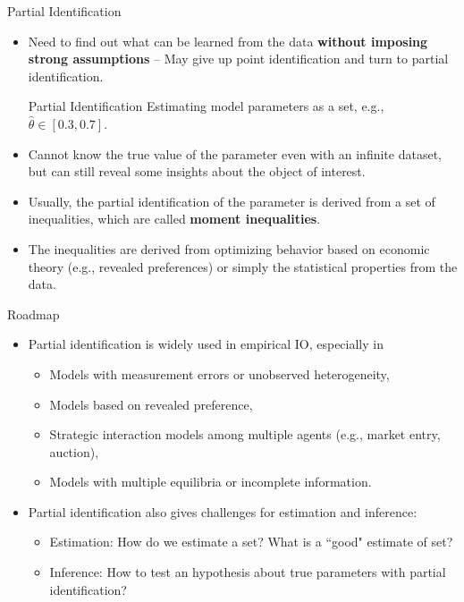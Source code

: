 \documentclass[aspectratio=169]{beamer}  %
\begin{document}
\begin{frame}{Partial Identification}

    \begin{itemize}
        \item Need to find out what can be learned from the data \textbf{without imposing strong assumptions} -- May give up point identification and turn to partial identification.
        \pause
        \begin{block}{Partial Identification}
            Estimating model parameters as a set, e.g., $\hat{\theta} \in [0.3, 0.7]$.
        \end{block}
        \pause
        \item Cannot know the true value of the parameter even with an infinite dataset, but can still reveal some insights about the object of interest.
        \item Usually, the partial identification of the parameter is derived from a set of inequalities, which are called \textbf{moment inequalities}.
        \item The inequalities are derived from optimizing behavior based on economic theory (e.g., revealed preferences) or simply the statistical properties from the data.

    \end{itemize}
\end{frame}

\begin{frame}{Roadmap}
    \begin{itemize}
        \item Partial identification is widely used in empirical IO, especially in
        \begin{itemize}
            \item Models with measurement errors or unobserved heterogeneity,
            \item Models based on revealed preference,
            \item Strategic interaction models among multiple agents (e.g., market entry, auction),
            \item Models with multiple equilibria or incomplete information.
        \end{itemize}
    \vspace{0.5cm}
        \item Partial identification also gives challenges for estimation and inference:
        \begin{itemize}
            \item Estimation: How do we estimate a set? What is a ``good" estimate of set?
            \item Inference: How to test an hypothesis about true parameters with partial identification?
        \end{itemize}
    \end{itemize}
\end{frame}
\end{document}
